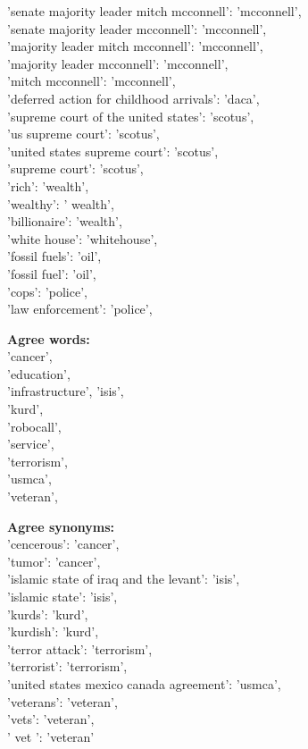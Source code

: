 \documentclass[../embeddings.tex]{subfiles}
\begin{document}
    'senate majority leader mitch mcconnell': 'mcconnell',\\
    'senate majority leader mcconnell': 'mcconnell',\\
    'majority leader mitch mcconnell': 'mcconnell',\\
    'majority leader mcconnell': 'mcconnell',\\
    'mitch mcconnell': 'mcconnell',\\
    'deferred action for childhood arrivals': 'daca',\\
    'supreme court of the united states': 'scotus',\\
    'us supreme court': 'scotus',\\
    'united states supreme court': 'scotus',\\
    'supreme court': 'scotus',\\
    'rich': 'wealth',\\
    'wealthy': ' wealth',\\
    'billionaire': 'wealth',\\
    'white house': 'whitehouse',\\
    'fossil fuels': 'oil',\\
    'fossil fuel': 'oil',\\
    'cops': 'police',\\
    'law enforcement': 'police',

\textbf{Agree words:}\\
    'cancer',\\    
    'education',\\    
    'infrastructure', 'isis',\\
    'kurd',\\
    'robocall',\\    
    'service',\\ 
    'terrorism',\\    
    'usmca',\\
    'veteran',
    
\textbf{Agree synonyms:}\\
    'cencerous': 'cancer',\\
    'tumor': 'cancer',\\
    'islamic state of iraq and the levant': 'isis',\\
    'islamic state': 'isis',\\
    'kurds': 'kurd',\\
    'kurdish': 'kurd',\\    
    'terror attack': 'terrorism',\\
    'terrorist': 'terrorism',\\
    'united states mexico canada agreement': 'usmca',\\
    'veterans': 'veteran',\\
    'vets': 'veteran',\\
    ' vet ': 'veteran'
    
\end{document}
